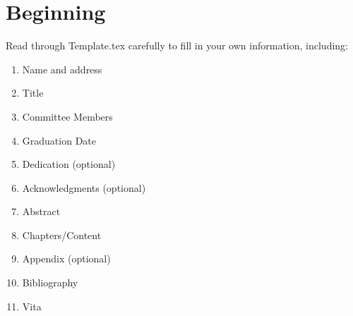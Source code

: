 \chapter{Beginning}
Read through Template.tex carefully to fill in your own information, including:
\begin{enumerate}
\item Name and address 
\item Title
\item Committee Members
\item Graduation Date
\item Dedication (optional)
\item Acknowledgments (optional)
\item Abstract
\item Chapters/Content
\item Appendix (optional)
\item Bibliography
\item Vita
\end{enumerate}
